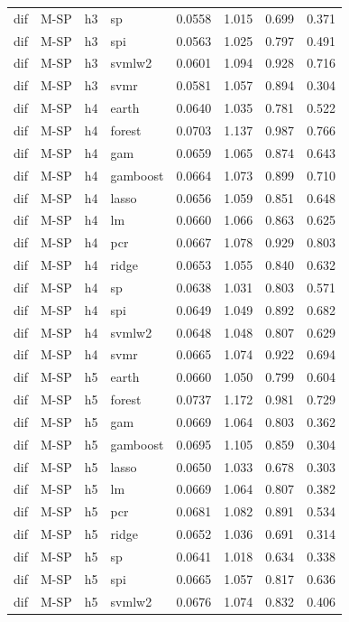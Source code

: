 \begin{ThreePartTable}
\begin{longtable}[t]{llclcccc}
dif & M-SP & h3 & sp & 0.0558 & 1.015 & 0.699 & 0.371\\
dif & M-SP & h3 & spi & 0.0563 & 1.025 & 0.797 & 0.491\\
dif & M-SP & h3 & svmlw2 & 0.0601 & 1.094 & 0.928 & 0.716\\
dif & M-SP & h3 & svmr & 0.0581 & 1.057 & 0.894 & 0.304\\
\addlinespace
dif & M-SP & h4 & earth & 0.0640 & 1.035 & 0.781 & 0.522\\
dif & M-SP & h4 & forest & 0.0703 & 1.137 & 0.987 & 0.766\\
dif & M-SP & h4 & gam & 0.0659 & 1.065 & 0.874 & 0.643\\
dif & M-SP & h4 & gamboost & 0.0664 & 1.073 & 0.899 & 0.710\\
dif & M-SP & h4 & lasso & 0.0656 & 1.059 & 0.851 & 0.648\\
dif & M-SP & h4 & lm & 0.0660 & 1.066 & 0.863 & 0.625\\
dif & M-SP & h4 & pcr & 0.0667 & 1.078 & 0.929 & 0.803\\
dif & M-SP & h4 & ridge & 0.0653 & 1.055 & 0.840 & 0.632\\
dif & M-SP & h4 & sp & 0.0638 & 1.031 & 0.803 & 0.571\\
dif & M-SP & h4 & spi & 0.0649 & 1.049 & 0.892 & 0.682\\
dif & M-SP & h4 & svmlw2 & 0.0648 & 1.048 & 0.807 & 0.629\\
dif & M-SP & h4 & svmr & 0.0665 & 1.074 & 0.922 & 0.694\\
\addlinespace
dif & M-SP & h5 & earth & 0.0660 & 1.050 & 0.799 & 0.604\\
dif & M-SP & h5 & forest & 0.0737 & 1.172 & 0.981 & 0.729\\
dif & M-SP & h5 & gam & 0.0669 & 1.064 & 0.803 & 0.362\\
dif & M-SP & h5 & gamboost & 0.0695 & 1.105 & 0.859 & 0.304\\
dif & M-SP & h5 & lasso & 0.0650 & 1.033 & 0.678 & 0.303\\
dif & M-SP & h5 & lm & 0.0669 & 1.064 & 0.807 & 0.382\\
dif & M-SP & h5 & pcr & 0.0681 & 1.082 & 0.891 & 0.534\\
dif & M-SP & h5 & ridge & 0.0652 & 1.036 & 0.691 & 0.314\\
dif & M-SP & h5 & sp & 0.0641 & 1.018 & 0.634 & 0.338\\
dif & M-SP & h5 & spi & 0.0665 & 1.057 & 0.817 & 0.636\\
dif & M-SP & h5 & svmlw2 & 0.0676 & 1.074 & 0.832 & 0.406\\

\end{longtable}
\end{ThreePartTable}
